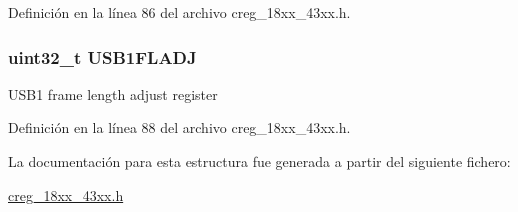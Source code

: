 Definición en la línea 86 del archivo creg\+\_\+18xx\+\_\+43xx.\+h.

\subsubsection[{\texorpdfstring{U\+S\+B1\+F\+L\+A\+DJ}{USB1FLADJ}}]{ uint32\+\_\+t U\+S\+B1\+F\+L\+A\+DJ}\hypertarget{struct_l_p_c___c_r_e_g___t_aae191a2f00bcf20484f70a9409c2eee1}{}\label{struct_l_p_c___c_r_e_g___t_aae191a2f00bcf20484f70a9409c2eee1}
U\+S\+B1 frame length adjust register 

Definición en la línea 88 del archivo creg\+\_\+18xx\+\_\+43xx.\+h.



La documentación para esta estructura fue generada a partir del siguiente fichero\+:\begin{DoxyCompactItemize}
\item 
\hyperlink{creg__18xx__43xx_8h}{creg\+\_\+18xx\+\_\+43xx.\+h}\end{DoxyCompactItemize}
